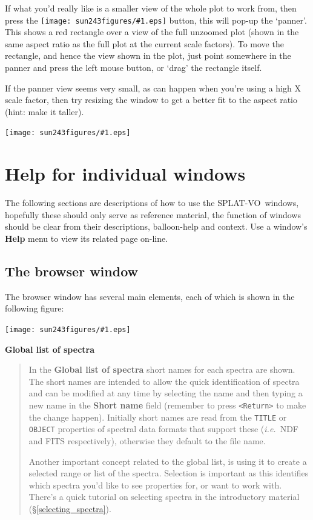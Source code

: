 \documentclass[twoside,11pt]{article}
\newcommand{\htmladdimg}[1]{}
\newcommand{\htmlref}[2]{#1}
\newcommand{\latex}[1]{#1}
\newcommand{\latexhtml}[2]{#1}
\newcommand{\xlabel}[1]{}
\renewcommand{\_}{\texttt{\symbol{95}}}
\newcommand{\SPLAT}{\textsf{SPLAT-VO}}
\newcommand{\mainfigure}[1]
{\begin{center}
 \latexhtml{\texttt{[image: sun243\_figures/\#1.eps]}}{\htmladdimg{#1.gif}}
 \end{center}
}
\newcommand{\inline}[1]
        {\latexhtml{\texttt{[image: sun243\_figures/\#1.eps]}}
        {\htmladdimg[align=center]{#1.gif}}}
\newcommand{\menuitem}[1]{\textbf{#1}}
\newcommand{\labelitem}[1]{\textbf{#1}}
\newcommand{\hitext}[1]{\texttt{#1}}
\newcommand{\ie}{\textit{i.e.}}
\newcommand{\subheading}[1]{\textbf{\large{#1}}}
\begin{document}
If what you'd really like is a smaller view of the whole plot to work
from, then press the \inline{panner} button, this will pop-up the
`panner'. This shows a red rectangle over a view of the full unzoomed
plot (shown in the same aspect ratio as the full plot at the current
scale factors). To move the rectangle, and hence the view shown in the
plot, just point somewhere in the panner and press the left mouse
button, or `drag' the rectangle itself.

If the panner view seems very small, as can happen when you're using a
high X scale factor, then try resizing the window to get a better fit
to the aspect ratio (hint: make it taller).

\mainfigure{pannerwindow}

\section{Help for individual windows\xlabel{help_window_individual}}

The following sections are descriptions of how to use the
\SPLAT\ windows, hopefully these should only serve as reference
material, the function of windows should be clear from their
descriptions, balloon-help and context. Use a window's \menuitem{Help}
menu to view its related page on-line.

\newpage
\subsection{The browser window\xlabel{browser_window}}

The browser window has several main elements, each of which is shown
in the following figure:

\mainfigure{browser5}

\subheading{Global list of spectra}
\begin{quote}
 In the \labelitem{Global list of spectra} short names for each
 spectra are shown. The short names are intended to allow the quick
 identification of spectra and can be modified at any time by
 selecting the name and then typing a new name in the
 \labelitem{Short name} field (remember to press \hitext{<Return>} to
 make the change happen). Initially short names are read from the
 \hitext{TITLE} or \hitext{OBJECT} properties of spectral data formats
 that support these (\ie\ NDF and FITS respectively), otherwise they
 default to the file name.

 Another important concept related to the global list, is using it to
 create a selected range or list of the spectra. Selection is
 important as this identifies which spectra you'd like to see
 properties for, or want to work with. There's a quick tutorial on
 \htmlref{selecting spectra}{selecting_spectra} in the introductory material
 \latex{(\S\ref{selecting_spectra})}.
\end{quote}
\end{document}
